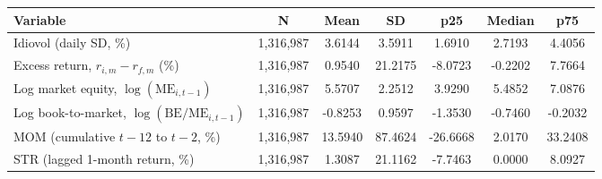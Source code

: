 \begin{tabular}{lcccccc}
\toprule
Variable & N & Mean & SD & p25 & Median & p75 \\
\midrule
Idiovol (daily SD, \%) & 1,316,987 & 3.6144 & 3.5911 & 1.6910 & 2.7193 & 4.4056 \\
Excess return, $r_{i,m}-r_{f,m}$ (\%) & 1,316,987 & 0.9540 & 21.2175 & -8.0723 & -0.2202 & 7.7664 \\
Log market equity, $\log(\mathrm{ME}_{i,t-1})$ & 1,316,987 & 5.5707 & 2.2512 & 3.9290 & 5.4852 & 7.0876 \\
Log book-to-market, $\log(\mathrm{BE}/\mathrm{ME}_{i,t-1})$ & 1,316,987 & -0.8253 & 0.9597 & -1.3530 & -0.7460 & -0.2032 \\
MOM (cumulative $t{-}12$ to $t{-}2$, \%) & 1,316,987 & 13.5940 & 87.4624 & -26.6668 & 2.0170 & 33.2408 \\
STR (lagged 1-month return, \%) & 1,316,987 & 1.3087 & 21.1162 & -7.7463 & 0.0000 & 8.0927 \\
\bottomrule
\end{tabular}

